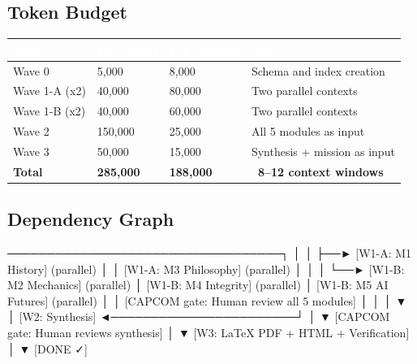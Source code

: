\documentclass[11pt,letterpaper]{article}
\newcommand{\tableheader}[1]{\textbf{\sffamily\textcolor{white}{#1}}}
\begin{document}
\subsection{Token Budget}

\begin{center}
\begin{tabularx}{\textwidth}{L{3cm}C{2cm}C{2cm}X}
\toprule
{}
\tableheader{Wave} & \tableheader{Est.\ Input} & \tableheader{Est.\ Output} & \tableheader{Notes} \\
\midrule
Wave 0 & 5,000 & 8,000 & Schema and index creation \\
Wave 1-A (x2) & 40,000 & 80,000 & Two parallel contexts \\
Wave 1-B (x2) & 40,000 & 60,000 & Two parallel contexts \\
Wave 2 & 150,000 & 25,000 & All 5 modules as input \\
Wave 3 & 50,000 & 15,000 & Synthesis + mission as input \\
\midrule
\textbf{Total} & \textbf{285,000} & \textbf{188,000} & \textbf{~8--12 context windows} \\
\bottomrule
\end{tabularx}
\end{center}

\subsection{Dependency Graph}

\begin{asciibox}
  [W0: Schema]──────────────────────────────────┐
        │                                        │
        ├──► [W1-A: M1 History]     (parallel)  │
        │    [W1-A: M3 Philosophy]  (parallel)  │
        │                                        │
        └──► [W1-B: M2 Mechanics]   (parallel)  │
             [W1-B: M4 Integrity]   (parallel)  │
             [W1-B: M5 AI Futures]  (parallel)  │
                                                │
  [CAPCOM gate: Human review all 5 modules]     │
              │                                  │
              ▼                                  │
         [W2: Synthesis] ◄───────────────────────┘
              │
              ▼
  [CAPCOM gate: Human reviews synthesis]
              │
              ▼
  [W3: LaTeX PDF + HTML + Verification]
              │
              ▼
          [DONE ✓]
\end{asciibox}
\end{document}
